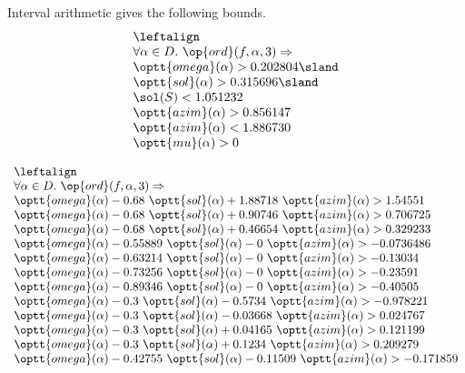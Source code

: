 Interval arithmetic gives the following bounds.
$$
\begin{array}{lll}
\leftalign\\
  \forall \alpha\in D. \ \op{ord}(f,\alpha,3) 
   \Rightarrow \\ 
      \optt{omega}(\alpha) > 0.202804  \sland \\
   \optt{sol}(\alpha) > 0.315696 \sland \\
   \sol(S) < 1.051232\\
   \optt{azim}(\alpha) > 0.856147\\
   \optt{azim}(\alpha) < 1.886730\\
   \optt{mu}(\alpha) > 0
\end{array}
$$

$$
\begin{array}{lll}
\leftalign\\
\forall\alpha\in D. \ \op{ord}(f,\alpha,3) \Rightarrow \\
   \optt{omega}(\alpha) - 0.68\ \optt{sol}(\alpha) + 1.88718\ \optt{azim}(\alpha) > 1.54551 \\
   \optt{omega}(\alpha) - 0.68\ \optt{sol}(\alpha) + 0.90746\ \optt{azim}(\alpha) > 0.706725\\
   \optt{omega}(\alpha) - 0.68\ \optt{sol}(\alpha) + 0.46654\ \optt{azim}(\alpha) > 0.329233\\
   \optt{omega}(\alpha) - 0.55889\ \optt{sol}(\alpha) - 0\ \optt{azim}(\alpha) > -0.0736486\\
   \optt{omega}(\alpha) - 0.63214\ \optt{sol}(\alpha) - 0\ \optt{azim}(\alpha) > -0.13034\\
   \optt{omega}(\alpha) - 0.73256\ \optt{sol}(\alpha) - 0\ \optt{azim}(\alpha) > -0.23591\\
   \optt{omega}(\alpha) - 0.89346\ \optt{sol}(\alpha) - 0\ \optt{azim}(\alpha) > -0.40505\\
   \optt{omega}(\alpha) - 0.3\ \optt{sol}(\alpha) - 0.5734\ \optt{azim}(\alpha) > -0.978221\\
   \optt{omega}(\alpha) - 0.3\ \optt{sol}(\alpha) - 0.03668\ \optt{azim}(\alpha) > 0.024767\\
   \optt{omega}(\alpha) - 0.3\ \optt{sol}(\alpha) + 0.04165\ \optt{azim}(\alpha) > 0.121199\\
   \optt{omega}(\alpha) - 0.3\ \optt{sol}(\alpha) + 0.1234\ \optt{azim}(\alpha) > 0.209279\\
   \optt{omega}(\alpha) - 0.42755\ \optt{sol}(\alpha) - 0.11509\ \optt{azim}(\alpha) > -0.171859\\

\end{array}$$
